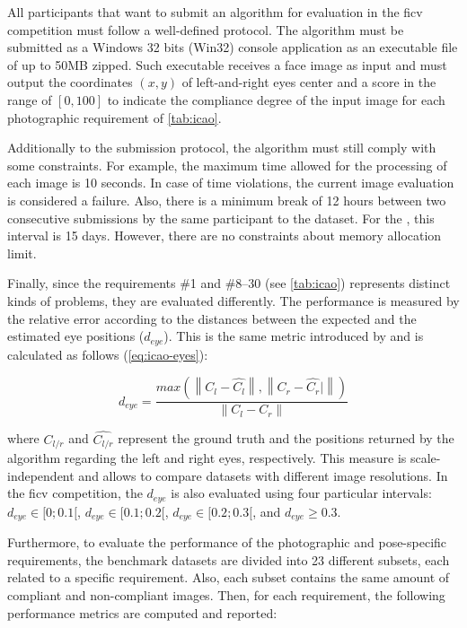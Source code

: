All participants that want to submit an algorithm for evaluation in the \acs{ficv} competition must follow a well-defined protocol. The algorithm must be submitted as a Windows 32 bits (Win32) console application as an executable file of up to 50MB zipped. Such executable receives a face image as input and must output the coordinates $(x, y)$ of left-and-right eyes center and a score in the range of $[0, 100]$ to indicate the compliance degree of the input image for each photographic requirement of \autoref{tab:icao}.

Additionally to the submission protocol, the algorithm must still comply with some constraints. For example, the maximum time allowed for the processing of each image is 10 seconds. In case of time violations, the current image evaluation is considered a failure. Also, there is a minimum break of 12 hours between two consecutive submissions by the same participant to the \ficvtest dataset. For the \ficvofficial, this interval is 15 days. However, there are no constraints about memory allocation limit.

Finally, since the requirements \#1 and \#8--30 (see \autoref{tab:icao}) represents distinct kinds of problems, they are evaluated differently. The \eyecenterlocation performance is measured by the relative error according to the distances between the expected and the estimated eye positions ($d_{eye}$). This is the same metric introduced by \cite{jesorsky2001robust} and is calculated as follows (\autoref{eq:icao-eyes}):

\begin{equation}
\label{eq:icao-eyes}
d_{eye} = \frac{max(\left\| C_l - \hat{C_l} \right\|, \left\| C_r -\hat{C_r}|\right\|)}{\left\| C_l - C_r \right\|}
\end{equation}

\noindent
where $C_{l/r}$ and $\hat{C_{l/r}}$ represent the ground truth and the positions returned by the algorithm regarding the left and right eyes, respectively. This measure is scale-independent and allows to compare datasets with different image resolutions. In the \acs{ficv} competition, the $d_{eye}$ is also evaluated using four particular intervals: $d_{eye} \in [0;0.1[$, $d_{eye} \in [0.1;0.2[$, $d_{eye} \in [0.2;0.3[$, and $d_{eye} \geq 0.3$.

Furthermore, to evaluate the performance of the photographic and pose-specific requirements, the benchmark datasets are divided into 23 different subsets, each related to a specific requirement. Also, each subset contains the same amount of compliant and non-compliant images. Then, for each requirement, the following performance metrics are computed and reported:

